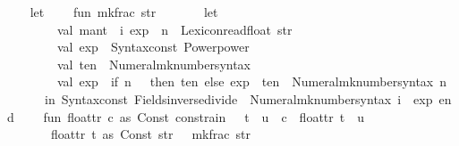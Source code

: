 \begin{isabellebody}
\isadelimML
\isanewline
%
\endisadelimML
%
\isatagML
{}\isamarkupfalse%
\ {\isacartoucheopen}\isanewline
\ \ let\isanewline
\ \ \ \ fun\ mk{\isacharunderscore}{\kern0pt}frac\ str\ {\isacharequal}{\kern0pt}\isanewline
\ \ \ \ \ \ let\isanewline
\ \ \ \ \ \ \ \ val\ {\isacharbraceleft}{\kern0pt}mant\ {\isacharequal}{\kern0pt}\ i{\isacharcomma}{\kern0pt}\ exp\ {\isacharequal}{\kern0pt}\ n{\isacharbraceright}{\kern0pt}\ {\isacharequal}{\kern0pt}\ Lexicon{\isachardot}{\kern0pt}read{\isacharunderscore}{\kern0pt}float\ str{\isacharsemicolon}{\kern0pt}\isanewline
\ \ \ \ \ \ \ \ val\ exp\ {\isacharequal}{\kern0pt}\ Syntax{\isachardot}{\kern0pt}const\ \isactrlconstUNDERSCOREsyntax {\isasymopen}Power{\isachardot}{\kern0pt}power{\isasymclose}{\isacharsemicolon}{\kern0pt}\isanewline
\ \ \ \ \ \ \ \ val\ ten\ {\isacharequal}{\kern0pt}\ Numeral{\isachardot}{\kern0pt}mk{\isacharunderscore}{\kern0pt}number{\isacharunderscore}{\kern0pt}syntax\ {}{}{\isacharsemicolon}{\kern0pt}\isanewline
\ \ \ \ \ \ \ \ val\ exp{}{}\ {\isacharequal}{\kern0pt}\ if\ n\ {\isacharequal}{\kern0pt}\ {}\ then\ ten\ else\ exp\ {\isachardollar}{\kern0pt}\ ten\ {\isachardollar}{\kern0pt}\ Numeral{\isachardot}{\kern0pt}mk{\isacharunderscore}{\kern0pt}number{\isacharunderscore}{\kern0pt}syntax\ n{\isacharsemicolon}{\kern0pt}\isanewline
\ \ \ \ \ \ in\ Syntax{\isachardot}{\kern0pt}const\ \isactrlconstUNDERSCOREsyntax {\isasymopen}Fields{\isachardot}{\kern0pt}inverse{\isacharunderscore}{\kern0pt}divide{\isasymclose}\ {\isachardollar}{\kern0pt}\ Numeral{\isachardot}{\kern0pt}mk{\isacharunderscore}{\kern0pt}number{\isacharunderscore}{\kern0pt}syntax\ i\ {\isachardollar}{\kern0pt}\ exp{}{}\ end{\isacharsemicolon}{\kern0pt}\isanewline
\isanewline
\ \ \ \ fun\ float{\isacharunderscore}{\kern0pt}tr\ {\isacharbrackleft}{\kern0pt}{\isacharparenleft}{\kern0pt}c\ as\ Const\ {\isacharparenleft}{\kern0pt}\isactrlsyntaxUNDERSCOREconst {\isasymopen}{\isacharunderscore}{\kern0pt}constrain{\isasymclose}{\isacharcomma}{\kern0pt}\ {\isacharunderscore}{\kern0pt}{\isacharparenright}{\kern0pt}{\isacharparenright}{\kern0pt}\ {\isachardollar}{\kern0pt}\ t\ {\isachardollar}{\kern0pt}\ u{\isacharbrackright}{\kern0pt}\ {\isacharequal}{\kern0pt}\ c\ {\isachardollar}{\kern0pt}\ float{\isacharunderscore}{\kern0pt}tr\ {\isacharbrackleft}{\kern0pt}t{\isacharbrackright}{\kern0pt}\ {\isachardollar}{\kern0pt}\ u\isanewline
\ \ \ \ \ \ {\isacharbar}{\kern0pt}\ float{\isacharunderscore}{\kern0pt}tr\ {\isacharbrackleft}{\kern0pt}t\ as\ Const\ {\isacharparenleft}{\kern0pt}str{\isacharcomma}{\kern0pt}\ {\isacharunderscore}{\kern0pt}{\isacharparenright}{\kern0pt}{\isacharbrackright}{\kern0pt}\ {\isacharequal}{\kern0pt}\ mk{\isacharunderscore}{\kern0pt}frac\ str\isanewline

\end{isabellebody}
